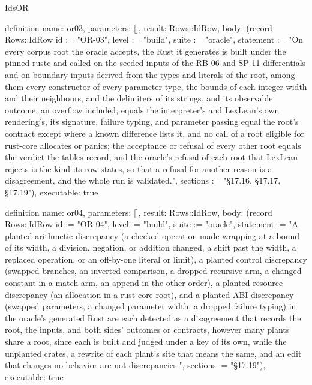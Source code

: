 \begin{lexlean}{IdsOR}
\begin{semanticmodule}
definition{
  name: or03,
  parameters: [],
  result: Rows::IdRow,
  body: (record Rows::IdRow {id := "OR-03", level := "build", suite := "oracle", statement := "On every corpus root the oracle accepts, the Rust it generates is built under the pinned rustc and called on the seeded inputs of the RB-06 and SP-11 differentials and on boundary inputs derived from the types and literals of the root, among them every constructor of every parameter type, the bounds of each integer width and their neighbours, and the delimiters of its strings, and its observable outcome, an overflow included, equals the interpreter's and LexLean's own rendering's, its signature, failure typing, and parameter passing equal the root's contract except where a known difference lists it, and no call of a root eligible for rust-core allocates or panics; the acceptance or refusal of every other root equals the verdict the tables record, and the oracle's refusal of each root that LexLean rejects is the kind its row states, so that a refusal for another reason is a disagreement, and the whole run is validated.", sections := "§17.16, §17.17, §17.19"}),
  executable: true
}

definition{
  name: or04,
  parameters: [],
  result: Rows::IdRow,
  body: (record Rows::IdRow {id := "OR-04", level := "build", suite := "oracle", statement := "A planted arithmetic discrepancy (a checked operation made wrapping at a bound of its width, a division, negation, or addition changed, a shift past the width, a replaced operation, or an off-by-one literal or limit), a planted control discrepancy (swapped branches, an inverted comparison, a dropped recursive arm, a changed constant in a match arm, an append in the other order), a planted resource discrepancy (an allocation in a rust-core root), and a planted ABI discrepancy (swapped parameters, a changed parameter width, a dropped failure typing) in the oracle's generated Rust are each detected as a disagreement that records the root, the inputs, and both sides' outcomes or contracts, however many plants share a root, since each is built and judged under a key of its own, while the unplanted crates, a rewrite of each plant's site that means the same, and an edit that changes no behavior are not discrepancies.", sections := "§17.19"}),
  executable: true
}


\end{semanticmodule}
\end{lexlean}
